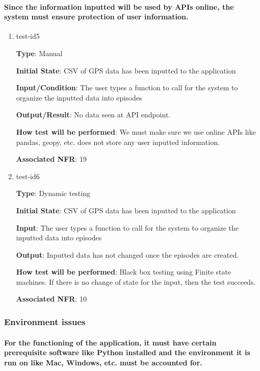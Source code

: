 \documentclass[12pt, titlepage]{article}
\begin{document}
\paragraph{Since the information inputted will be used by APIs online, the system must ensure protection of user information.}

\begin{enumerate}

\item{test-id5\\}

\textbf{Type}: Manual
					
\textbf{Initial State}: CSV of GPS data has been inputted to the application
					
\textbf{Input/Condition}: The user types a function to call for the system to organize the
inputted data into episodes
					
\textbf{Output/Result}: No data seen at API endpoint.
					
\textbf{How test will be performed}: We must make sure we use online APIs like pandas, geopy, etc. does not store any user inputted information.

\textbf{Associated NFR}: 19

\item{test-id6\\}

\textbf{Type}: Dynamic testing
					
\textbf{Initial State}: CSV of GPS data has been inputted to the application
					
\textbf{Input}: The user types a function to call for the system to organize the
inputted data into episodes
					
\textbf{Output}: Inputted data has not changed once the episodes are created.
					
\textbf{How test will be performed}: Black box testing using Finite state machines. If there is no change of state for the input, then the test succeeds. 

\textbf{Associated NFR}: 10

\end{enumerate}

\subsubsection{Environment issues}
		
\paragraph{For the functioning of the application, it must have certain prerequisite software like Python installed and the environment it is run on like Mac, Windows, etc. must be accounted for.}
\end{document}
